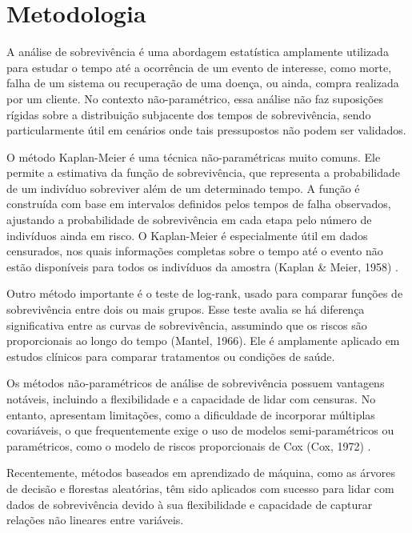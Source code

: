 \section{Metodologia}


A análise de sobrevivência é uma abordagem estatística amplamente utilizada para estudar o tempo até a ocorrência de um evento de interesse, como morte, falha de um sistema ou recuperação de uma doença, ou ainda, compra realizada por um cliente. No contexto não-paramétrico, essa análise não faz suposições rígidas sobre a distribuição subjacente dos tempos de sobrevivência, sendo particularmente útil em cenários onde tais pressupostos não podem ser validados.

O método Kaplan-Meier é uma  técnica não-paramétricas muito comuns. Ele permite a estimativa da função de sobrevivência, que representa a probabilidade de um indivíduo sobreviver além de um determinado tempo. A função é construída com base em intervalos definidos pelos tempos de falha observados, ajustando a probabilidade de sobrevivência em cada etapa pelo número de indivíduos ainda em risco. O Kaplan-Meier é especialmente útil em dados censurados, nos quais informações completas sobre o tempo até o evento não estão disponíveis para todos os indivíduos da amostra (Kaplan \& Meier, 1958) \cite{kaplan1958nonparametric}.

Outro método importante é o teste de log-rank, usado para comparar funções de sobrevivência entre dois ou mais grupos. Esse teste avalia se há diferença significativa entre as curvas de sobrevivência, assumindo que os riscos são proporcionais ao longo do tempo (Mantel, 1966). Ele é amplamente aplicado em estudos clínicos para comparar tratamentos ou condições de saúde.

Os métodos não-paramétricos de análise de sobrevivência possuem vantagens notáveis, incluindo a flexibilidade e a capacidade de lidar com censuras. No entanto, apresentam limitações, como a dificuldade de incorporar múltiplas covariáveis, o que frequentemente exige o uso de modelos semi-paramétricos ou paramétricos, como o modelo de riscos proporcionais de Cox (Cox, 1972) \cite{cox1972regression}.




 Recentemente, métodos baseados em aprendizado de máquina, como as árvores de decisão e florestas aleatórias, têm sido aplicados com sucesso para lidar com dados de sobrevivência devido à sua flexibilidade e capacidade de capturar relações não lineares entre variáveis.

